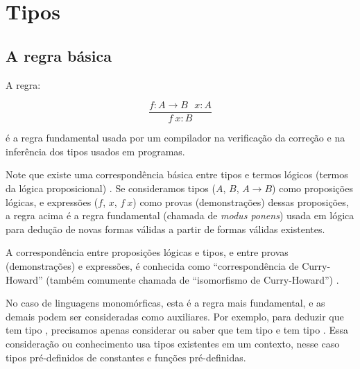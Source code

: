 %



%

%

%
\chapter{Tipos}

\section{A regra básica}
\label{Regra-basica}

A regra:

  \[ \frac{f : A \rightarrow B \:\:\: x : A}{f\: x : B} \]

é a regra fundamental usada por um compilador na verificação da
correção e na inferência dos tipos usados em programas.

Note que existe uma correspondência básica entre tipos e termos
lógicos (termos da lógica proposicional)
\cite{Martin-Lof:Constructive-math-and-programming,Sorensen-Urzyczyn:2006:Lectures-Curry-Howard-Iso}.
  Se consideramos tipos ($A$, $B$, $A \rightarrow B$) como proposições
  lógicas, e expressões ($f$, $x$, $f \:x$) como provas
  (demonstrações) dessas proposições, a regra acima é a regra
  fundamental (chamada de {\em modus ponens\/}) usada em lógica para
  dedução de novas formas válidas a partir de formas válidas
  existentes.

A correspondência entre proposições lógicas e tipos, e entre provas
(demonstrações) e expressões, é conhecida como ``correspondência de
Curry-Howard'' (também comumente chamada de ``isomorfismo de
Curry-Howard'')
\cite{Martin-Lof:Constructive-math-and-programming,Sorensen-Urzyczyn:2006:Lectures-Curry-Howard-Iso}.

No caso de linguagens monomórficas, esta é a regra mais fundamental, e
as demais podem ser consideradas como auxiliares. Por exemplo, para
deduzir que  tem tipo , precisamos apenas
considerar ou saber que  tem tipo  e
 tem tipo . Essa consideração ou conhecimento usa
tipos existentes em um contexto, nesse caso tipos pré-definidos de
constantes e funções pré-definidas.

